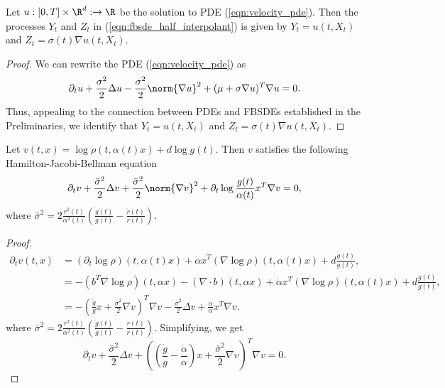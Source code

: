 \begin{lemma}\label{lemma_app:pde_fbsde}
    Let $u:[0,T]\times\R^d:\rightarrow\R$ be the solution to PDE (\ref{eqn:velocity_pde}). Then the processes $Y_t$ and $Z_t$ in (\ref{eqn:fbsde_half_interpolant}) is given by $Y_t=u(t,X_t)$ and $Z_t=\sigma(t)\nabla u(t,X_t)$.
\end{lemma}
\begin{proof}
    We can rewrite the PDE (\ref{eqn:velocity_pde}) as 
    \begin{equation*}
        \partial_t u + \frac{\sigma^2}{2}\Delta u - \frac{\sigma^2}{2}\norm{\nabla u}^2 + (\mu+\sigma\nabla u)^T\nabla u = 0.
    \end{equation*}
    Thus, appealing to the connection between PDEs and FBSDEs established in the Preliminaries, we identify that $Y_t = u(t,X_t)$ and $Z_t=\sigma(t)\nabla u(t,X_t)$.
\end{proof}

\begin{lemma}\label{lemma_app:score_pde}
    Let $v(t,x) = \log\rho(t,\alpha(t)x)+d\log g(t)$. Then $v$ satisfies the following Hamilton-Jacobi-Bellman equation
\begin{equation}\label{eqn_app:score_pde}
    \partial_t v+\frac{\bar{\sigma}^2}{2}\Delta v+\frac{\bar{\sigma}^2}{2}\norm{\nabla v}^2+\partial_t\log{\frac{g(t)}{\alpha(t)}}x^T\nabla v=0,
\end{equation}
where $\bar{\sigma}^2 = 2\frac{r^2(t)}{\alpha^2(t)}\left(\frac{\dot g(t)}{g(t)}-\frac{\dot r(t)}{r(t)}\right)$.
\end{lemma}
\begin{proof}
\begin{align*}
    \partial_t v(t,x) &= (\partial_t\log\rho)(t,\alpha(t)x)+\dot\alpha x^T(\nabla\log\rho)(t,\alpha(t)x)+d\frac{\dot g(t)}{g(t)},\\
    &= -(b^T\nabla \log\rho)(t,\alpha x)-(\nabla\cdot b)(t,\alpha x)+\dot\alpha x^T(\nabla\log\rho)(t,\alpha(t)x)+d\frac{\dot g(t)}{g(t)},\\
    &= -\left(\frac{\dot g}{g}x+\frac{\bar{\sigma}^2}{2}\nabla v\right)^T\nabla v - \frac{\bar{\sigma}^2}{2}\Delta v + \frac{\dot \alpha}{\alpha}x^T\nabla v.
\end{align*}
where $\bar{\sigma}^2 = 2\frac{r^2(t)}{\alpha^2(t)}\left(\frac{\dot g(t)}{g(t)}-\frac{\dot r(t)}{r(t)}\right)$. Simplifying, we get
\begin{equation}
    \partial_t v+\frac{\bar{\sigma}^2}{2}\Delta v+\left(\left(\frac{\dot g}{g}-\frac{\dot \alpha}{\alpha}\right)x+\frac{\bar{\sigma}^2}{2}\nabla v\right)^T\nabla v=0.
\end{equation}
\end{proof}

